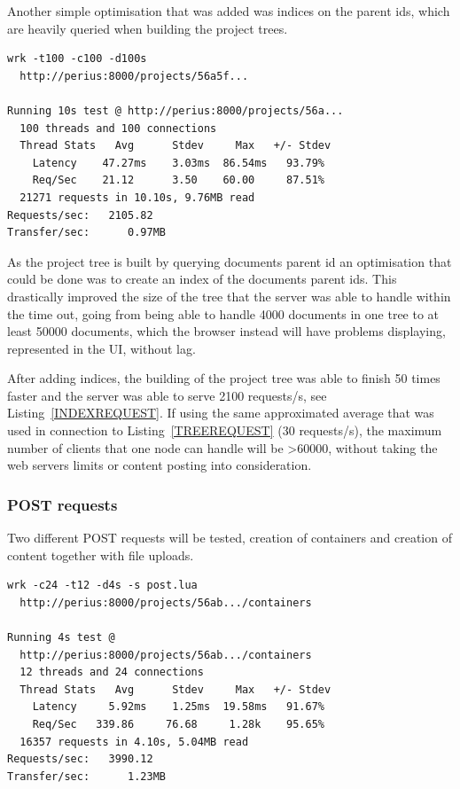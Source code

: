 \documentclass[a4paper,12pt]{article}
\begin{document}
\par
Another simple optimisation that was added was indices on the parent ids, which are heavily queried
when building the project trees.

\begin{minipage}{\linewidth-1cm}
\begin{lstlisting}[label=INDEXREQUEST,caption=Result of indexed project tree requests]
wrk -t100 -c100 -d100s 
  http://perius:8000/projects/56a5f...
 
Running 10s test @ http://perius:8000/projects/56a...
  100 threads and 100 connections
  Thread Stats   Avg      Stdev     Max   +/- Stdev
    Latency    47.27ms    3.03ms  86.54ms   93.79%
    Req/Sec    21.12      3.50    60.00     87.51%
  21271 requests in 10.10s, 9.76MB read
Requests/sec:   2105.82
Transfer/sec:      0.97MB
\end{lstlisting}
\end{minipage}

\par
As the project tree is built by querying documents parent id an optimisation that could be done was
to create an index of the documents parent ids. This drastically improved the size of the tree that
the server was able to handle within the time out, going from being able to handle 4000 documents in 
one tree to at least 50000 documents, which the browser instead will have problems displaying, 
represented in the UI, without lag.

\par
After adding indices, the building of the project tree was able to finish 50 times faster and the
server was able to serve 2100 requests/s, see Listing~\ref{INDEXREQUEST}. If using the same
approximated average that was used in connection to Listing~\ref{TREEREQUEST} (30 requests/s), the
maximum number of clients that one node can handle will be >60000, without taking the web servers
limits or content posting into consideration.

\subsubsection{POST requests}
Two different POST requests will be tested, creation of containers and creation of content together
with file uploads. 

\begin{minipage}{\linewidth-1cm}
\begin{lstlisting}[label=CONTAINERPOSTREQUEST,caption=Result of container creation]
wrk -c24 -t12 -d4s -s post.lua 
  http://perius:8000/projects/56ab.../containers 
  
Running 4s test @ 
  http://perius:8000/projects/56ab.../containers
  12 threads and 24 connections
  Thread Stats   Avg      Stdev     Max   +/- Stdev
    Latency     5.92ms    1.25ms  19.58ms   91.67%
    Req/Sec   339.86     76.68     1.28k    95.65%
  16357 requests in 4.10s, 5.04MB read
Requests/sec:   3990.12
Transfer/sec:      1.23MB
\end{lstlisting}
\end{minipage}
\end{document}
